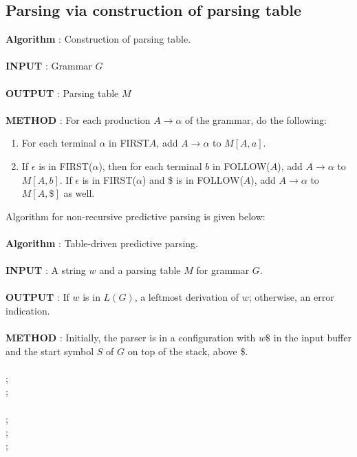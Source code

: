 \documentclass[12pt]{article}
\begin{document}
\subsection{Parsing via construction of parsing table}
\textbf{Algorithm} : Construction of parsing table. \\
\\
\textbf{INPUT} : Grammar $G$ \\
\\
\textbf{OUTPUT} : Parsing table $M$ \\
\\
\textbf{METHOD} : For each production $A \rightarrow \alpha$ of the grammar, do the following:
\begin{enumerate}
\item For each terminal $\alpha$ in FIRST{$A$}, add $A \rightarrow \alpha$ to $M[A, a]$.
\item If $\epsilon$ is in FIRST($\alpha$), then for each terminal $b$ in FOLLOW($A$), add $A \rightarrow \alpha$ to $M[A,b]$. If $\epsilon$ is in FIRST($\alpha$) and \$ is in FOLLOW($A$), add $A \rightarrow \alpha$ to $M[A,\$]$ as well.  
\end{enumerate}
Algorithm for non-recursive predictive parsing is given below: \\
\\
\textbf{Algorithm} : Table-driven predictive parsing.\\
\\
\textbf{INPUT} : A string $w$ and a parsing table $M$ for grammar $G$. \\
\\
\textbf{OUTPUT} : If $w$ is in $L(G)$, a leftmost derivation of $w$; otherwise, an error indication.\\
\\
\textbf{METHOD} : Initially, the parser is in a configuration with $w\$$ in the input buffer and the start symbol $S$ of $G$ on top of the stack, above \$. \\
\\
; \\
; \\
 \\
\indent{}; \\
\indent{}; \\
\indent{}; \\
\end{document}
